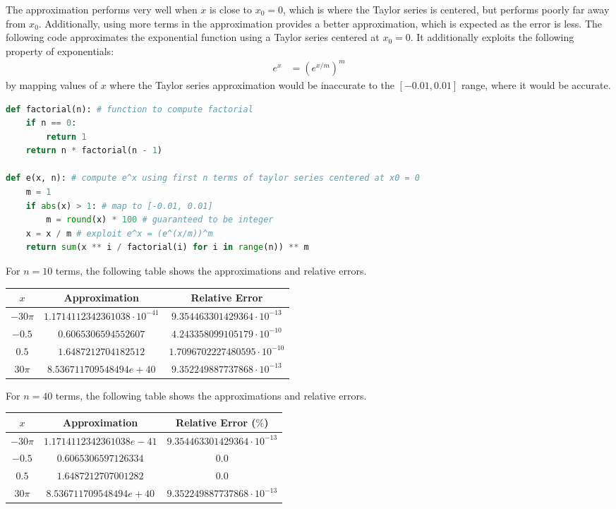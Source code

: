 \documentclass{article}
\begin{document}
The approximation performs very well when $x$ is close to $x_0 = 0$, which is where the Taylor series is centered, but performs poorly far away from $x_0$. Additionally, using more terms in the approximation provides a better approximation, which is expected as the error is less.
The following code approximates the exponential function using a Taylor series centered at $x_0 = 0$. It additionally exploits the following property of exponentials:
\begin{align*}
    e^x & = (e^{x/m})^m
\end{align*}
by mapping values of $x$ where the Taylor series approximation would be inaccurate to the $[-0.01, 0.01]$ range, where it would be accurate.
\begin{lstlisting}[language=Python]
def factorial(n): # function to compute factorial
    if n == 0:
        return 1
    return n * factorial(n - 1)

def e(x, n): # compute e^x using first n terms of taylor series centered at x0 = 0
    m = 1
    if abs(x) > 1: # map to [-0.01, 0.01] 
        m = round(x) * 100 # guaranteed to be integer
    x = x / m # exploit e^x = (e^(x/m))^m
    return sum(x ** i / factorial(i) for i in range(n)) ** m
\end{lstlisting}
For $n = 10$ terms, the following table shows the approximations and relative errors.
\begin{center}
    \begin{tabular}{|c|c|c|}
        \hline
        $x$ & Approximation & Relative Error \\
        \hline
        $-30\pi$ & $1.1714112342361038 \cdot 10^{-41}$ & $9.354463301429364 \cdot 10^{-13}$ \\
        \hline
        $-0.5$ & $0.6065306594552607$ & $4.243358099105179 \cdot 10^{-10}$ \\
        \hline
        $0.5$ & $1.6487212704182512$ & $1.7096702227480595 \cdot 10^{-10}$ \\
        \hline
        $30\pi$ & $8.536711709548494e+40$ & $9.352249887737868 \cdot 10^{-13}$ \\
        \hline
    \end{tabular}
\end{center}
For $n = 40$ terms, the following table shows the approximations and relative errors.
\begin{center}
    \begin{tabular}{|c|c|c|}
        \hline
        $x$ & Approximation & Relative Error ($\%$) \\
        \hline
        $-30\pi$ & $1.1714112342361038e-41$ & $9.354463301429364 \cdot 10^{-13}$ \\
        \hline
        $-0.5$ & $0.6065306597126334$ & $0.0$ \\
        \hline
        $0.5$ & $1.6487212707001282$ & $0.0$ \\
        \hline
        $30\pi$ & $8.536711709548494e+40$ & $9.352249887737868 \cdot 10^{-13}$ \\
        \hline
    \end{tabular}
\end{center}
\end{document}
